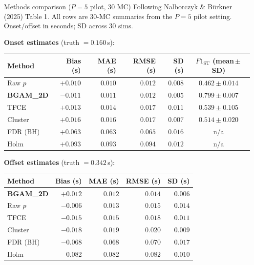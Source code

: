 \documentclass{beamer}
\begin{document}
\begin{frame}{Methods comparison ($P=5$ pilot, 30 MC)}
\scriptsize
Following Nalborczyk \& Bürkner (2025) Table 1.
All rows are 30-MC summaries from the $P=5$ pilot setting.
Onset/offset in seconds; SD across 30 sims.

\medskip
\textbf{Onset estimates} (truth $= 0.160$\,s):

\begin{tabular}{lrrrrc}
\toprule
Method        & Bias (s)            & MAE (s)             & RMSE (s)            & SD (s)             & $F1_{\text{ST}}$ (mean\,$\pm$\,SD) \\
\midrule
Raw $p$       & $+0.010$            & $\mathbf{0.010}$    & $0.012$             & $0.008$            & $0.462 \pm 0.014$ \\
\textbf{BGAM\_2D} & $-0.011$        & $0.011$             & $\mathbf{0.012}$    & $\mathbf{0.005}$   & $\mathbf{0.799 \pm 0.007}$ \\
TFCE          & $+0.013$            & $0.014$             & $0.017$             & $0.011$            & $0.539 \pm 0.105$ \\
Cluster       & $+0.016$            & $0.016$             & $0.017$             & $0.007$            & $0.514 \pm 0.020$ \\
FDR (BH)      & $+0.063$            & $0.063$             & $0.065$             & $0.016$            & n/a \\
Holm          & $+0.093$            & $0.093$             & $0.094$             & $0.012$            & n/a \\
\bottomrule
\end{tabular}

\medskip
\textbf{Offset estimates} (truth $= 0.342$\,s):

\begin{tabular}{lrrrr}
\toprule
Method        & Bias (s)            & MAE (s)             & RMSE (s)            & SD (s) \\
\midrule
\textbf{BGAM\_2D} & $+0.012$        & $\mathbf{0.012}$    & $\mathbf{0.014}$    & $\mathbf{0.006}$ \\
Raw $p$       & $-0.006$            & $0.013$             & $0.015$             & $0.014$ \\
TFCE          & $-0.015$            & $0.015$             & $0.018$             & $0.011$ \\
Cluster       & $-0.018$            & $0.019$             & $0.020$             & $0.009$ \\
FDR (BH)      & $-0.068$            & $0.068$             & $0.070$             & $0.017$ \\
Holm          & $-0.082$            & $0.082$             & $0.082$             & $0.010$ \\
\bottomrule
\end{tabular}

\end{frame}
\end{document}
